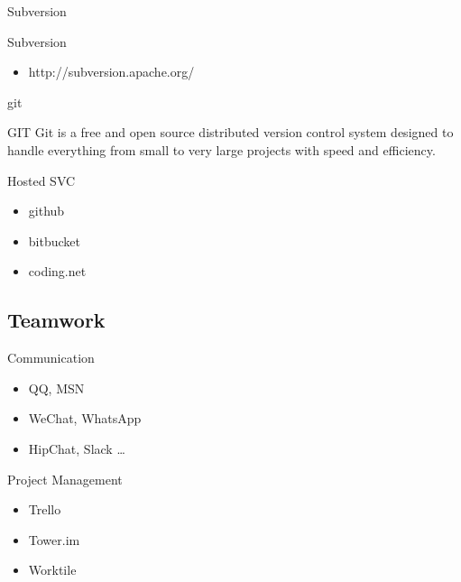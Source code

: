 \documentclass[UTF8]{beamer}
\begin{document}
\begin{frame}[t]{Subversion}
    \begin{block}{Subversion}
        \begin{itemize}
            \item http://subversion.apache.org/
        \end{itemize}
    \end{block}
\end{frame}

\begin{frame}[t]{git}
    \begin{block}{GIT}
        Git is a free and open source distributed version control system designed to handle everything from small to very large projects with speed and efficiency.
    \end{block}
\end{frame}


\begin{frame}[t]{Hosted SVC}
    \begin{itemize}
        \item github
        \item bitbucket
        \item coding.net
    \end{itemize}
\end{frame}

\subsection{Teamwork}
\begin{frame}[t]{Communication}
    \begin{itemize}
        \item QQ, MSN
        \item WeChat, WhatsApp
        \item HipChat, Slack \ldots
    \end{itemize}
\end{frame}

\begin{frame}[t]{Project Management}
    \begin{itemize}
        \item Trello
        \item Tower.im
        \item Worktile
    \end{itemize}

\end{frame}
\end{document}
